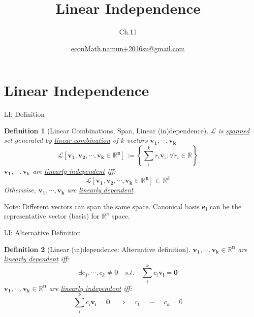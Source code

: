 \documentclass[final]{beamer}
\author[조남운]{\url{econMath.namun+2016su@gmail.com}}
\title{Linear Independence}
\subtitle{Ch.11}
\newtheorem{defn}{Definition}
\begin{document}
	
\maketitle


\section{Linear Independence} %
\label{sec:linear_independence}
\begin{frame}[t]{LI: Definition}
	\begin{defn}
		[Linear Combinations, Span, Linear (in)dependence]
		$\mathcal{L}$ is \uline{spanned} set generated by \uline{linear combination} of $k$ vectors $\mathbf{v_1,\cdots,v_k}$
		\[
			\mathcal{L}[\mathbf{v_1,v_2,\cdots,v_k\in\mathbb{R}^n}]:=\left\{\sum_i^k r_i \mathbf{v}_i: \forall r_i\in \mathbb{R} \right\}
		\]
		$\mathbf{v_1,\cdots,v_k}$ are \uline{linearly independent} iff:
		\[
			\mathcal{L}[\mathbf{v_1,v_2,\cdots,v_k\in\mathbb{R}^n}]\subset \mathbb{R}^k
		\]
		Otherwise, $\mathbf{v_1,\cdots,v_k}$ are \uline{linearly dependent}
	\end{defn}
	Note: Different vectors can span the same space. Canonical basis $\mathbf{e_i}$ can be the representative vector (basis) for $\mathbb{R}^n$ space.
\end{frame}

\begin{frame}[t]{LI: Alternative Definition}
	\begin{defn}
		[Linear (in)dependence: Alternative definition]
		$\mathbf{v_1,\cdots,v_k\in\mathbb{R}^n}$ are \uline{linearly dependent} iff:
		\[
			\exists c_1,\cdots,c_k \neq 0 \quad s.t.\quad \sum_i^k c_i\mathbf{v_i} = \mathbf{0}
		\]
		$\mathbf{v_1,\cdots,v_k\in\mathbb{R}^n}$ are \uline{linearly independent} iff:
		\[
			\sum_i^k c_i\mathbf{v_i} = \mathbf{0} \quad\Rightarrow\quad c_1 = \cdots = c_k = 0
		\]
	\end{defn}
\end{frame}
\end{document}
